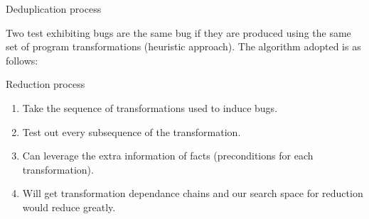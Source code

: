 \documentclass{beamer}
\begin{document}
    \begin{frame}{Deduplication process}

        Two test exhibiting bugs are the same bug if they are produced using the same set of program transformations (heuristic approach). 
        The algorithm adopted is as follows:
        \begin{figure}
            \centering
        \end{figure}

    \end{frame}


    \begin{frame}{Reduction process}
        \begin{enumerate}
            \item Take the sequence of transformations used to induce bugs. 
            \item Test out every subsequence of the transformation.
            \item Can leverage the extra information of facts (preconditions for each transformation).
            \item Will get transformation dependance chains and our search space for reduction would reduce greatly. 
        \end{enumerate}    

    
    \end{frame}
\end{document}
